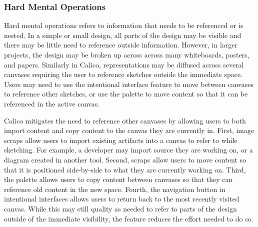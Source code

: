 \documentclass[12pt,fleqn]{ucithesis}
\begin{document}
%


\subsubsection{Hard Mental Operations}
Hard mental operations refers to information that needs to be referenced or is nested. In a simple or small design, all parts of the design may be visible and there may be little need to reference outside information. However, in larger projects, the design may be broken up across across many whiteboards, posters, and papers. Similarly in Calico, representations may be diffused across several canvases requiring the user to reference sketches outside the immediate space. Users may need to use the intentional interface feature to move between canvases to reference other sketches, or use the palette to move content so that it can be referenced in the active canvas. 

Calico mitigates the need to reference other canvases by allowing users to both import content and copy content to the canvas they are currently in. First, image scraps allow users to import existing artifacts into a canvas to refer to while sketching. For example, a developer may import source they are working on, or a diagram created in another tool. Second, scraps allow users to move content so that it is positioned side-by-side to what they are currently working on. Third, the palette allows users to copy content between canvases so that they can reference old content in the new space. Fourth, the navigation button in intentional interfaces allows users to return back to the most recently visited canvas. While this may still quality as needed to refer to parts of the design outside of the immediate visibility, the feature reduces the effort needed to do so.

\end{document}
